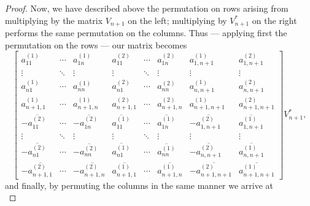 \documentclass[11pt,reqno]{amsart}
\theoremstyle{definition}
\numberwithin{equation}{section}
\begin{document}
\begin{proof}
    Now, we have described above the permutation on rows arising from multiplying by the matrix \(V_{n+1}\) on the left; multiplying by \(V_{n+1}^*\) on the right performs the same permutation on the columns. Thus --- applying first the permutation on the rows --- our matrix becomes
    \[
        \begin{bmatrix} a_{11}^{(1)} & \cdots & a_{1n}^{(1)} & a_{11}^{(2)} & \cdots & a_{1n}^{(2)} & a_{1,n+1}^{(1)} & a_{1,n+1}^{(2)} \\[6pt] \vdots & \ddots & \vdots & \vdots & \ddots & \vdots & \vdots & \vdots \\[6pt] a_{n1}^{(1)} & \cdots & a_{nn}^{(1)} & a_{n1}^{(2)} & \cdots & a_{nn}^{(2)}  & a_{n,n+1}^{(1)} & a_{n,n+1}^{(2)} \\[6pt] a_{n+1,1}^{(1)} & \cdots & a_{n+1,n}^{(1)} & a_{n+1,1}^{(2)} & \cdots & a_{n+1,n}^{(2)}& a_{n+1,n+1}^{(1)} & a_{n+1,n+1}^{(2)} \\[6pt] -\overline{a_{11}^{(2)}} & \cdots & -\overline{a_{1n}^{(2)}} & \overline{a_{11}^{(1)}} & \cdots & \overline{a_{1n}^{(1)}} & -\overline{a_{1,n+1}^{(2)}} & \overline{a_{1,n+1}^{(1)}} \\[6pt] \vdots & \ddots & \vdots & \vdots & \ddots & \vdots & \vdots & \vdots \\[6pt] -\overline{a_{n1}^{(2)}} & \cdots & -\overline{a_{nn}^{(2)}} & \overline{a_{n1}^{(1)}} & \cdots & \overline{a_{nn}^{(1)}} & -\overline{a_{n,n+1}^{(2)}} & \overline{a_{n,n+1}^{(1)}} \\[6pt] -\overline{a_{n+1,1}^{(2)}} & \cdots & -\overline{a_{n+1,n}^{(2)}} & \overline{a_{n+1,1}^{(1)}} & \cdots & \overline{a_{n+1,n}^{(1)}} & -\overline{a_{n+1,n+1}^{(2)}} & \overline{a_{n+1,n+1}^{(1)}} \end{bmatrix} V_{n+1}^*,
    \]
    and finally, by permuting the columns in the same manner we arrive at
    \[
\]
\end{proof}
\end{document}
